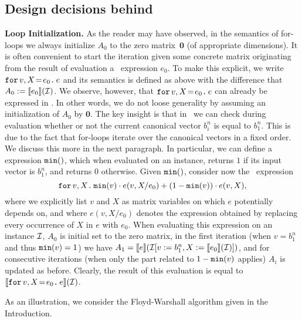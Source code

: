 \subsection{Design decisions behind \langfor}\label{sec:formatlang:design}
\noindent\textbf{Loop Initialization.} As the reader may have observed, in the semantics of for-loops we 
always initialize $A_0$ to the zero matrix~$\mathbf{0}$ (of appropriate dimensions). It is often convenient
to start the iteration given some concrete matrix  originating from the result of evaluation a \langfor\ expression $e_0$. To make this explicit, we write $\initf{e_0}{v}{X}{e}$ and its semantics is defined as above
with the difference that $A_0:=\sem{e_0}{\I}$. We observe, however, that $\initf{e_0}{v}{X}{e}$ can already
be expressed in \langfor. In other words, we do not loose generality by assuming an initialization of $A_0$ by $\mathbf{0}$.
The key insight is that in \langfor\ we can check during evaluation whether or not
the current canonical vector $b_i^n$ is equal to $b_1^n$. This 
is due to the fact that for-loops iterate over the canonical vectors in a fixed order. We discuss this more in the next paragraph.
In particular, we can define a \langfor expression $\mmin$, which when evaluated on an instance, returns $1$ if its input vector is $b_1^n$, and returns $0$ otherwise. Given $\mmin$, consider now the
\langfor\ expression
 $$\ffor{v}{X}{\mmin{v}\cdot e(v,X/e_0) + (1-\mmin{v})\cdot e(v,X)},$$
 where we explicitly list $v$ and $X$ as matrix variables on which $e$ potentially depends on, and where
 $e(v,X/e_0)$ denotes the expression obtained by replacing every occurrence of $X$ in $e$ with $e_0$.
When evaluating this expression on an instance $\I$, $A_0$ is initial set to the zero matrix, in the first iteration (when  $v=b_1^n$ and thus $\mmin{v}=1$)
we have $A_1=\sem{e}{\I[v:=b_1^n,X:=\sem{e_0}{\I}]}$, and for consecutive iterations (when only the part related to $1-\mmin{v}$ applies) $A_i$ is updated as before. Clearly, the result of this evaluation is equal to
$\sem{\initf{e_0}{v}{X}{e}}{\I}$. 


As an illustration, we consider the Floyd-Warshall algorithm given in the Introduction. 

